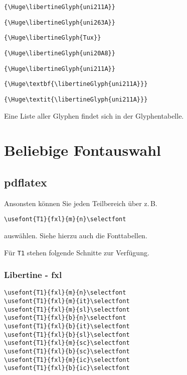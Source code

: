 \documentclass[ngerman]{libertinedoku}
\begin{document}
\begin{minipage}{10cm}
\verb|{\Huge\libertineGlyph{uni211A}}| \hfill {\Huge{}} \par\medskip
\verb|{\Huge\libertineGlyph{uni263A}}| \hfill {\Huge{}} \par\medskip
\verb|{\Huge\libertineGlyph{Tux}}| \hfill {\Huge{}} \par\medskip
\verb|{\Huge\libertineGlyph{uni20A8}}| \hfill {\Huge{}} \par

\bigskip
\verb|{\Huge\libertineGlyph{uni211A}}| \hfill {\Huge{}} \par\medskip
\verb|{\Huge\textbf{\libertineGlyph{uni211A}}}| \hfill{\Huge\textbf{}} \par\medskip
\verb|{\Huge\textit{\libertineGlyph{uni211A}}}| \hfill {\Huge\textit{}} \par\medskip

\end{minipage}

Eine Liste aller Glyphen findet sich in der Glyphentabelle.

\newpage
\section{Beliebige Fontauswahl}

\subsection{pdflatex}

Ansonsten können Sie jeden Teilbereich über z.\,B.
\begin{lstlisting}
\usefont{T1}{fxl}{m}{n}\selectfont
\end{lstlisting}
auswählen. Siehe hierzu auch die Fonttabellen.

Für \texttt{T1} stehen folgende Schnitte zur Verfügung.

\subsubsection{Libertine - fxl}

\begin{lstlisting}
\usefont{T1}{fxl}{m}{n}\selectfont
\usefont{T1}{fxl}{m}{it}\selectfont
\usefont{T1}{fxl}{m}{sl}\selectfont
\usefont{T1}{fxl}{b}{n}\selectfont
\usefont{T1}{fxl}{b}{it}\selectfont
\usefont{T1}{fxl}{b}{sl}\selectfont
\usefont{T1}{fxl}{m}{sc}\selectfont
\usefont{T1}{fxl}{b}{sc}\selectfont
\usefont{T1}{fxl}{m}{ic}\selectfont
\usefont{T1}{fxl}{b}{ic}\selectfont
\end{lstlisting}
\end{document}
